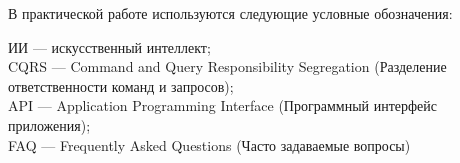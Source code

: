\label{sec:reduction}

В практической работе используются следующие условные обозначения:

ИИ — искусственный интеллект;\\
CQRS — Command and Query Responsibility Segregation (Разделение ответственности команд и запросов);\\
API — Application Programming Interface (Программный интерфейс приложения);\\
FAQ — Frequently Asked Questions (Часто задаваемые вопросы)


